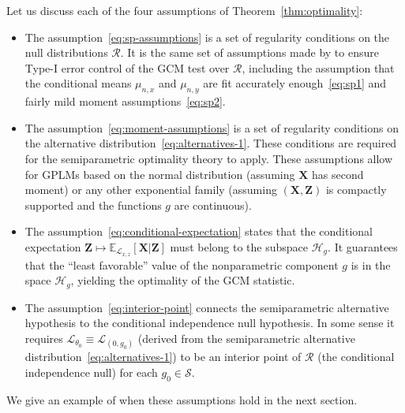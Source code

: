 \documentclass[12pt]{article}
\theoremstyle{definition}
\theoremstyle{remark}
\newcommand{\E}{\mathbb E}								%
\newcommand{\prx}{\bm X}								%
\newcommand{\prz}{\bm Z}								%
\newcommand{\law}{\mathcal L}							%
\newcommand{\regclass}{\mathscr R}					    %
\renewcommand{\H}{\mathcal H}		 					%
\begin{document}
	\noindent Let us discuss each of the four assumptions of Theorem~\ref{thm:optimality}:
	\begin{itemize}
		\item The assumption~\eqref{eq:sp-assumptions} is a set of regularity conditions on the null distributions $\regclass$. It is the same set of assumptions made by \citet{Shah2018} to ensure Type-I error control of the GCM test over $\regclass$, including the assumption that the conditional means $\mu_{n,x}$ and $\mu_{n,y}$ are fit accurately enough~\eqref{eq:sp1} and fairly mild moment assumptions~\eqref{eq:sp2}.
		\item The assumption~\eqref{eq:moment-assumptions} is a set of regularity conditions on the alternative distribution~\eqref{eq:alternatives-1}. These conditions are required for the semiparametric optimality theory to apply. These assumptions allow for GPLMs based on the normal distribution (assuming $\prx$ has second moment) or any other exponential family (assuming $(\prx, \prz)$ is compactly supported and the functions $g$ are continuous).
		\item The assumption~\eqref{eq:conditional-expectation} states that the conditional expectation $\prz \mapsto \E_{\law_{x,z}}[\prx|\prz]$ must belong to the subspace $\H_g$. It guarantees that the ``least favorable'' value of the nonparametric component $g$ is in the space $\H_g$, yielding the optimality of the GCM statistic.
		\item The assumption~\eqref{eq:interior-point} connects the semiparametric alternative hypothesis to the conditional independence null hypothesis. In some sense it requires $\law_{\theta_0} \equiv \law_{(0, g_0)}$ (derived from the semiparametric alternative distribution~\eqref{eq:alternatives-1}) to be an interior point of $\regclass$ (the conditional independence null) for each $g_0 \in \mathcal S$.
	\end{itemize}
	We give an example of when these assumptions hold in the next section.
	
\end{document}
